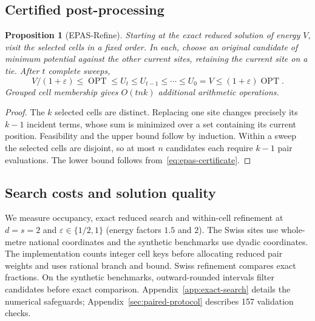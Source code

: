 \documentclass[a4paper,12pt]{article}
\newcommand{\OPT}{\operatorname{OPT}}
\newtheorem{proposition}[theorem]{Proposition}
\numberwithin{equation}{section}
\begin{document}
\subsection{Certified post-processing}\label{sec:refine}
\begin{proposition}[EPAS-Refine]\label{prop:refine}
Starting at the exact reduced solution of energy $V$, visit the selected cells
in a fixed order. In each, choose an original candidate of minimum potential
against the other current sites, retaining the current site on a tie.
After $t$ complete sweeps,
\[
 V/(1+\varepsilon)\le\OPT\le U_t\le U_{t-1}\le\cdots\le U_0=V
 \le(1+\varepsilon)\OPT .
\]
Grouped cell membership gives $O(tnk)$ additional arithmetic operations.
\end{proposition}
\begin{proof}
The $k$ selected cells are distinct. Replacing one site changes precisely its
$k-1$ incident terms, whose sum is minimized over a set containing its current
position. Feasibility and the upper bound follow by induction. Within a sweep
the selected cells are disjoint, so at most $n$ candidates each require $k-1$
pair evaluations. The lower bound follows from~\eqref{eq:epas-certificate}.
\end{proof}

\subsection{Search costs and solution quality}
We measure occupancy, exact reduced search and within-cell refinement at $d=s=2$ and
$\varepsilon\in\{1/2,1\}$ (energy factors $1.5$ and $2$). The Swiss sites use whole-metre national
coordinates and the synthetic benchmarks use dyadic coordinates. The implementation counts integer
cell keys before allocating reduced pair weights and uses rational branch and bound. Swiss
refinement compares exact fractions. On the synthetic benchmarks, outward-rounded intervals filter
candidates before exact comparison. Appendix~\ref{app:exact-search} details the numerical
safeguards; Appendix~\ref{sec:paired-protocol} describes 157 validation checks.
\end{document}
